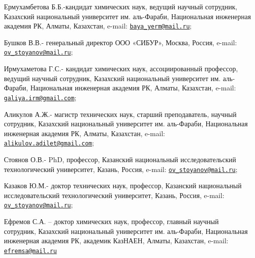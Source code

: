 Ермухамбетова Б.Б.-кандидат химических наук, ведущий научный сотрудник,
Казахский национальный университет им. аль-Фараби, Национальная
инженерная академия РК, Алматы, Казахстан, e-mail:
\href{mailto:baya_yerm@mail.ru}{\nolinkurl{baya\_yerm@mail.ru}};

Бушков В.В.- генеральный директор ООО «СИБУР», Москва, Россия, e-mail:
\href{mailto:ov_stoyanov@mail.ru}{\nolinkurl{ov\_stoyanov@mail.ru}};

Ирмухаметова Г.С.- кандидат химических наук, ассоциированный профессор,
ведущий научный сотрудник, Казахский национальный университет им.
аль-Фараби, Национальная инженерная академия РК, Алматы, Казахстан,
e-mail:
\href{mailto:galiya.irm@gmail.com}{\nolinkurl{galiya.irm@gmail.com}};

Аликулов А.Ж.- магистр технических наук, старший преподаватель, научный
сотрудник, Казахский национальный университет им. аль-Фараби,
Национальная инженерная академия РК, Алматы, Казахстан, e-mail:
\href{mailto:alikulov.adilet@gmail.com}{\nolinkurl{alikulov.adilet@gmail.com}};

Стоянов О.В.- PhD, профессор, Казанский национальный исследовательский
технологический университет, Казань, Россия, e-mail:
\href{mailto:ov_stoyanov@mail.ru}{\nolinkurl{ov\_stoyanov@mail.ru}};

Казаков Ю.М.- доктор технических наук, профессор, Казанский национальный
исследовательский технологический университет, Казань, Россия, e-mail:
\href{mailto:ov_stoyanov@mail.ru}{\nolinkurl{ov\_stoyanov@mail.ru}};

Ефремов С.А. -- доктор химических наук, профессор, главный научный
сотрудник, Казахский национальный университет им. аль-Фараби,
Национальная инженерная академия РК, академик КазНАЕН, Алматы,
Казахстан, e-mail:
\href{mailto:efremsa@mail.ru}{\nolinkurl{efremsa@mail.ru}}
